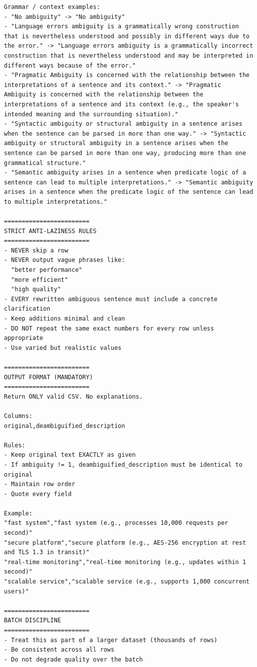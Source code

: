 \begin{lstlisting}[basicstyle=\ttfamily\footnotesize, breaklines=true, breakatwhitespace=false, frame=single, numbers=none, xleftmargin=10pt, xrightmargin=10pt]
Grammar / context examples:
- "No ambiguity" -> "No ambiguity"
- "Language errors ambiguity is a grammatically wrong construction that is nevertheless understood and possibly in different ways due to the error." -> "Language errors ambiguity is a grammatically incorrect construction that is nevertheless understood and may be interpreted in different ways because of the error."
- "Pragmatic Ambiguity is concerned with the relationship between the interpretations of a sentence and its context." -> "Pragmatic Ambiguity is concerned with the relationship between the interpretations of a sentence and its context (e.g., the speaker's intended meaning and the surrounding situation)."
- "Syntactic ambiguity or structural ambiguity in a sentence arises when the sentence can be parsed in more than one way." -> "Syntactic ambiguity or structural ambiguity in a sentence arises when the sentence can be parsed in more than one way, producing more than one grammatical structure."
- "Semantic ambiguity arises in a sentence when predicate logic of a sentence can lead to multiple interpretations." -> "Semantic ambiguity arises in a sentence when the predicate logic of the sentence can lead to multiple interpretations."

========================
STRICT ANTI-LAZINESS RULES
========================
- NEVER skip a row
- NEVER output vague phrases like:
  "better performance"
  "more efficient"
  "high quality"
- EVERY rewritten ambiguous sentence must include a concrete clarification
- Keep additions minimal and clean
- DO NOT repeat the same exact numbers for every row unless appropriate
- Use varied but realistic values

========================
OUTPUT FORMAT (MANDATORY)
========================
Return ONLY valid CSV. No explanations.

Columns:
original,deambiguified_description

Rules:
- Keep original text EXACTLY as given
- If ambiguity != 1, deambiguified_description must be identical to original
- Maintain row order
- Quote every field

Example:
"fast system","fast system (e.g., processes 10,000 requests per second)"
"secure platform","secure platform (e.g., AES-256 encryption at rest and TLS 1.3 in transit)"
"real-time monitoring","real-time monitoring (e.g., updates within 1 second)"
"scalable service","scalable service (e.g., supports 1,000 concurrent users)"

========================
BATCH DISCIPLINE
========================
- Treat this as part of a larger dataset (thousands of rows)
- Be consistent across all rows
- Do not degrade quality over the batch


\end{lstlisting}
